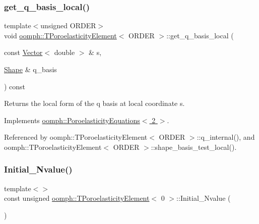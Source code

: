 \subsubsection{\texorpdfstring{get\+\_\+q\+\_\+basis\+\_\+local()}{get\_q\_basis\_local()}\hspace{0.1cm}{\footnotesize\ttfamily [3/3]}}
{\footnotesize\ttfamily template$<$unsigned O\+R\+D\+ER$>$ \\
void \hyperlink{classoomph_1_1TPoroelasticityElement}{oomph\+::\+T\+Poroelasticity\+Element}$<$ O\+R\+D\+ER $>$\+::get\+\_\+q\+\_\+basis\+\_\+local (\begin{DoxyParamCaption}\item[{const \hyperlink{classoomph_1_1Vector}{Vector}$<$ double $>$ \&}]{s,  }\item[{\hyperlink{classoomph_1_1Shape}{Shape} \&}]{q\+\_\+basis }\end{DoxyParamCaption}) const\hspace{0.3cm}{\ttfamily [virtual]}}



Returns the local form of the q basis at local coordinate s. 



Implements \hyperlink{classoomph_1_1PoroelasticityEquations_ab1784901ec76efaefc0a4b3f12cd9078}{oomph\+::\+Poroelasticity\+Equations$<$ 2 $>$}.



Referenced by oomph\+::\+T\+Poroelasticity\+Element$<$ O\+R\+D\+E\+R $>$\+::q\+\_\+internal(), and oomph\+::\+T\+Poroelasticity\+Element$<$ O\+R\+D\+E\+R $>$\+::shape\+\_\+basis\+\_\+test\+\_\+local().

\mbox{\label{classoomph_1_1TPoroelasticityElement_acc13c4552465946c609e1e0e00aa5d5d}} 
\subsubsection{\texorpdfstring{Initial\+\_\+\+Nvalue()}{Initial\_Nvalue()}\hspace{0.1cm}{\footnotesize\ttfamily [1/2]}}
{\footnotesize\ttfamily template$<$$>$ \\
const unsigned \hyperlink{classoomph_1_1TPoroelasticityElement}{oomph\+::\+T\+Poroelasticity\+Element}$<$ 0 $>$\+::Initial\+\_\+\+Nvalue (\begin{DoxyParamCaption}{ }\end{DoxyParamCaption})\hspace{0.3cm}{\ttfamily [private]}}



